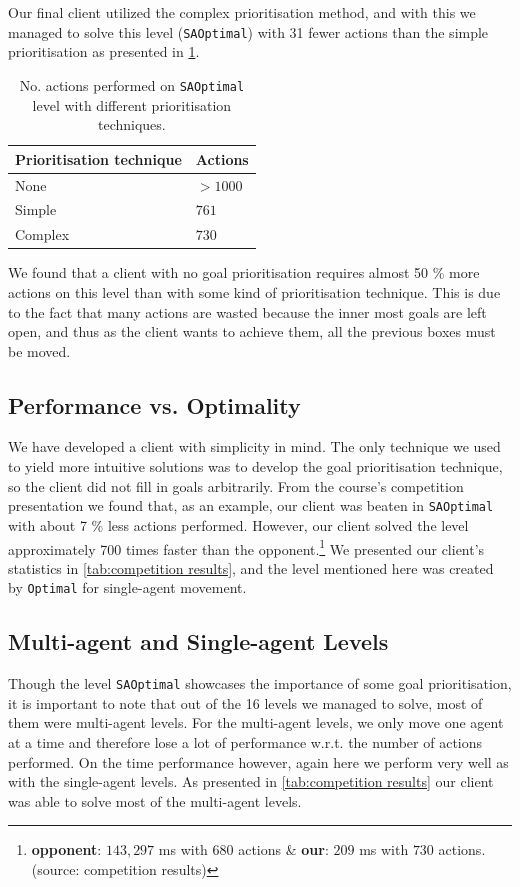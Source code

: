 Our final client utilized the complex prioritisation method, and with this we managed to solve this level (\texttt{SAOptimal}) with 31 fewer actions than the simple prioritisation as presented in \cref{tab:SAOptimal_results}.

\begin{table}[h!]
  \centering
  \begin{tabular}{@{}ll@{}}
    \toprule
    Prioritisation technique & Actions \\
    \midrule
    None    & $>1000$ \\
    Simple  & $761$ \\
    Complex & $730$ \\
    \bottomrule
  \end{tabular}
  \caption{\label{tab:SAOptimal_results}No. actions performed on \texttt{SAOptimal} level with different prioritisation techniques.}
\end{table}

We found that a client with no goal prioritisation requires almost 50 \% more actions on this level than with some kind of prioritisation technique.
This is due to the fact that many actions are wasted because the inner most goals are left open, and thus as the client wants to achieve them, all the previous boxes must be moved.

\subsection{Performance vs. Optimality}
\label{sec:performance vs. optimality}

We have developed a client with simplicity in mind.
The only technique we used to yield more intuitive solutions was to develop the goal prioritisation technique, so the client did not fill in goals arbitrarily.
From the course's competition presentation we found that, as an example, our client was beaten in \texttt{SAOptimal} with about 7 \% less actions performed.
However, our client solved the level approximately 700 times faster than the opponent.\footnote{\textbf{opponent}: $143{,}297$ ms with $680$ actions \& \textbf{our}: $209$ ms with $730$ actions. (source: competition results)}
We presented our client's statistics in \cref{tab:competition results}, and the level mentioned here was created by \texttt{Optimal} for single-agent movement.

\subsection{Multi-agent and Single-agent Levels}

Though the level \texttt{SAOptimal} showcases the importance of some goal prioritisation, it is important to note that out of the 16 levels we managed to solve, most of them were multi-agent levels. For the multi-agent levels, we only move one agent at a time and therefore lose a lot of performance w.r.t. the number of actions performed. 
On the time performance however, again here we perform very well as with the single-agent levels. 
As presented in \cref{tab:competition results} our client was able to solve most of the multi-agent levels.
